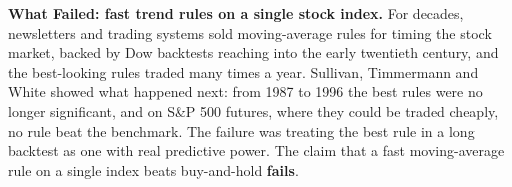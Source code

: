 \begin{callout}
\textbf{What Failed: fast trend rules on a single stock index.} For decades, newsletters and trading systems sold moving-average rules for timing the stock market, backed by Dow backtests reaching into the early twentieth century, and the best-looking rules traded many times a year. Sullivan, Timmermann and White showed what happened next: from 1987 to 1996 the best rules were no longer significant, and on S\&P 500 futures, where they could be traded cheaply, no rule beat the benchmark. The failure was treating the best rule in a long backtest as one with real predictive power. The claim that a fast moving-average rule on a single index beats buy-and-hold \textbf{fails}.
\end{callout}
